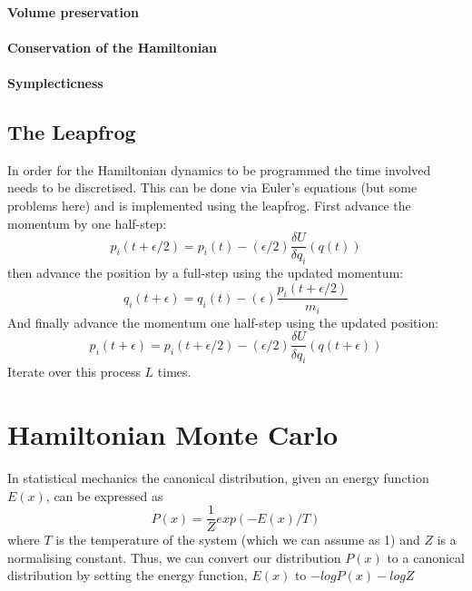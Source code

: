 \documentclass[11pt]{article}
\begin{document}
\paragraph{Volume preservation}
\paragraph{Conservation of the Hamiltonian}
\paragraph{Symplecticness}
\subsection{The Leapfrog}
In order for the Hamiltonian dynamics to be programmed the time involved needs to be discretised. This can be done via Euler's equations (but some problems here) and is implemented using the leapfrog.
First advance the momentum by one half-step:
\begin{equation}
p_{i}(t+\epsilon/2) = p_{i}(t) - (\epsilon/2)\frac{\delta U}{\delta q_{i}}(q(t))
\end{equation}
then advance the position by a full-step using the updated momentum:
\begin{equation}
q_{i}(t+\epsilon) = q_{i}(t) - (\epsilon)\frac{p_{i}(t+\epsilon/2)}{m_{i}}
\end{equation}
And finally advance the momentum one half-step using the updated position:
\begin{equation}
p_{i}(t+\epsilon) = p_{i}(t+\epsilon/2) - (\epsilon/2)\frac{\delta U}{\delta q_{i}}(q(t+\epsilon))
\end{equation}
Iterate over this process $L$ times.

\section{Hamiltonian Monte Carlo}
In statistical mechanics the canonical distribution, given an energy function $E(x)$, can be expressed as
\begin{equation}
P(x) = \frac{1}{Z}exp(-E(x)/T)
\end{equation}
where $T$ is the temperature of the system (which we can assume as 1) and $Z$ is a normalising constant. Thus, we can convert our distribution $P(x)$ to a canonical distribution by setting the energy function, $E(x)$ to $-logP(x)-logZ$
\end{document}
